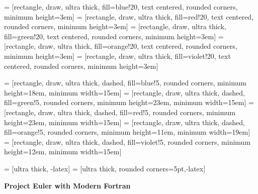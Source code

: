 \documentclass[10pt]{article}
\begin{document}

 = [rectangle, draw, ultra thick, fill=blue!20, 
    text centered, rounded corners, minimum height=3em]
 = [rectangle, draw, ultra thick, fill=red!20, 
    text centered, rounded corners, minimum height=3em]
 = [rectangle, draw, ultra thick, fill=green!20, 
    text centered, rounded corners, minimum height=3em]
 = [rectangle, draw, ultra thick, fill=orange!20, 
    text centered, rounded corners, minimum height=3em]
 = [rectangle, draw, ultra thick, fill=violet!20, 
    text centered, rounded corners, minimum height=3em]

 = [rectangle, draw, ultra thick, dashed, 
    fill=blue!5, rounded corners, minimum height=18em, minimum width=15em]
 = [rectangle, draw, ultra thick, dashed, 
    fill=green!5, rounded corners, minimum height=23em, minimum width=15em]
 = [rectangle, draw, ultra thick, dashed, 
    fill=red!5, rounded corners, minimum height=23em, minimum width=15em]
 = [rectangle, draw, ultra thick, dashed, 
    fill=orange!5, rounded corners, minimum height=11em, minimum width=19em]
 = [rectangle, draw, ultra thick, dashed, 
    fill=violet!5, rounded corners, minimum height=12em, minimum width=15em]

 = [ultra thick, -latex]
 = [ultra thick, rounded corners=5pt,-latex]

\vspace*{\fill}

\begin{center}
    \Huge \textbf{Project Euler with Modern Fortran}
\end{center}
\end{document}
